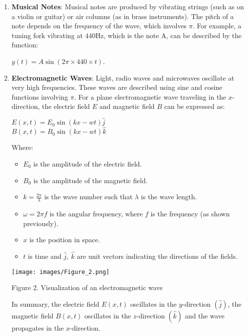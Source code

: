 \documentclass[12pt]{article}
\begin{document}
\begin{enumerate}
    \item \textbf{Musical Notes}: Musical notes are produced by vibrating strings (such as on a violin or guitar) or air columns (as in brass instruments). The pitch of a note depends on the frequency of the wave, which involves $\pi$. For example, a tuning fork vibrating at $440$Hz, which is the note A, can be described by the function:
    \begin{center}
        $y(t) = A\sin(2\pi \times 440\times t)$.
    \end{center}
    \item \textbf{Electromagnetic Waves}:
    Light, radio waves and microwaves oscillate at very high frequencies. These waves are described using sine and cosine functions involving $\pi$. For a plane electromagnetic wave traveling in the $x$-direction, the electric field $E$ and magnetic field $B$ can be expressed as:
    \begin{center}
        $E(x,t) = E_0\sin(kx - wt)\hat{j}$ \\ \vspace{3mm}
        $B(x,t) = B_0 \sin(kx - wt)\hat{k}$
    \end{center}
    Where:
    \begin{itemize}
        \item $E_0$ is the amplitude of the electric field.
        \item $B_0$ is the amplitude of the magnetic field.
        \item $k = \frac{2\pi}{\lambda}$ is the wave number such that $\lambda$ is the wave length.
        \item $\omega = 2\pi f$ is the angular frequency, where $f$ is the frequency (as shown previously).
        \item $x$ is the position in space.
        \item $t$ is time and $\hat{j}, \ \hat{k}$ are unit vectors indicating the directions of the fields.
    \end{itemize}
    \begin{center}
        \texttt{[image: images/Figure\_2.png]}
        \caption{Figure 2. Visualization of an electromagnetic wave}
    \end{center}
    \noindent In summary, the electric field $E(x,t)$ oscillates in the $y$-direction $(\hat{j})$, the magnetic field $B(x,t)$ oscillates in the $z$-direction $(\hat{k})$ and the wave propagates in the $x$-direction.
\end{enumerate}
\end{document}
